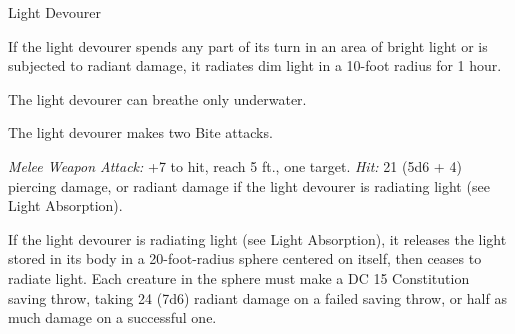 \documentclass[10pt,a4paper,twoside,bg=none,twocolumn,openany,nodeprecatedcode]{dndbook}
\begin{document}
\begin{DndMonster}[float=t]{Light Devourer}
\DndMonsterBasics[
armor-class = {14},
hit-points = {\DndDice{14d8 + 56}},
speed = {0 ft., swim 30 ft.}
]
\DndMonsterAbilityScores[
 str = 18,
 dex = 18,
 con = 18,
 int = 2,
 wis = 10,
 cha = 3
]
\DndMonsterDetails[
skills = {Perception +3, Stealth +10},
damage-immunities = {radiant},
senses = {darkvision 120 ft., passive perception 13},
challenge = 6,
]
If the light devourer spends any part of its turn in an area of bright light or is subjected to radiant damage, it radiates dim light in a 10-foot radius for 1 hour.

The light devourer can breathe only underwater.

\par
{}
The light devourer makes two Bite attacks.

\textsl{Melee Weapon Attack:} +7 to hit, reach 5 ft., one target. \textsl{Hit:} 21 (5d6 + 4) piercing damage, or radiant damage if the light devourer is radiating light (see Light Absorption).

\par
{}
If the light devourer is radiating light (see Light Absorption), it releases the light stored in its body in a 20-foot-radius sphere centered on itself, then ceases to radiate light. Each creature in the sphere must make a DC 15 Constitution saving throw, taking 24 (7d6) radiant damage on a failed saving throw, or half as much damage on a successful one.

\end{DndMonster}
\end{document}
